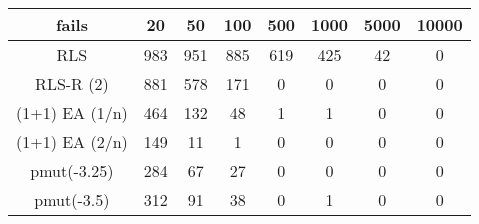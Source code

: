 \begin{tabular}[h]{cccccccc}
fails&20&50&100&500&1000&5000&10000\\\hline
RLS&983&951&885&619&425&42&0\\
RLS-R (2)&881&578&171&0&0&0&0\\
(1+1) EA (1/n)&464&132&48&1&1&0&0\\
(1+1) EA (2/n)&149&11&1&0&0&0&0\\
pmut(-3.25)&284&67&27&0&0&0&0\\
pmut(-3.5)&312&91&38&0&1&0&0\\
\end{tabular}
